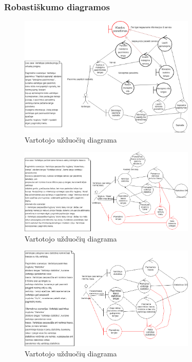 \documentclass[oneside]{VUMIFPSkursinis}
\begin{document}
		\subsubsection{Robastiškumo diagramos}


			\begin{figure}[h]
    				\centering
    				\includegraphics[width=0.75\textwidth]{rob1.png}
    				\caption{Vartotojo užduočių diagrama}
    				\label{fig:VartotojoUseCasel}
			\end{figure}

			\begin{figure}[h]
    				\centering
    				\includegraphics[width=0.75\textwidth]{rob2.png}
    				\caption{Vartotojo užduočių diagrama}
    				\label{fig:VartotojoUseCasel}
			\end{figure}

			\begin{figure}[h]
    				\centering
    				\includegraphics[width=0.75\textwidth]{rob3.png}
    				\caption{Vartotojo užduočių diagrama}
    				\label{fig:VartotojoUseCasel}
			\end{figure}
\end{document}
